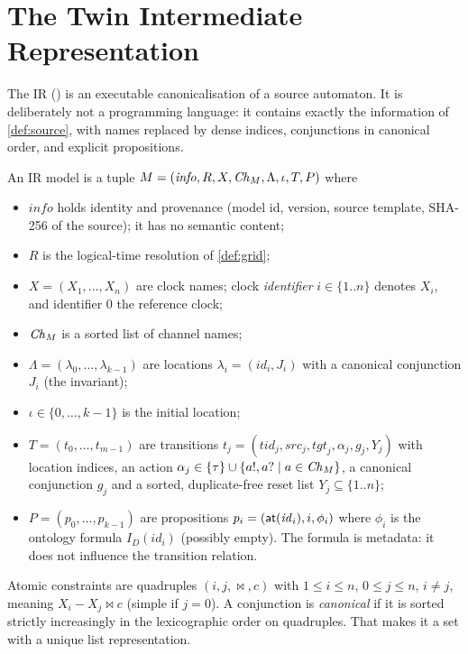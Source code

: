 \section{The Twin Intermediate Representation}\label{sec:ir}

The IR () is an executable canonicalisation of a
source automaton. It is deliberately not a programming language: it contains
exactly the information of \cref{def:source}, with names replaced by dense
indices, conjunctions in canonical order, and explicit propositions.

\begin{definition}[IR model]\label{def:ir}
An IR model is a tuple
$M=(\mathit{info},R,X,\mathit{Ch}_M,\Lambda,\iota,T,P)$ where
\begin{itemize}
\item $\mathit{info}$ holds identity and provenance (model id, version, source
  template, SHA-256 of the source); it has no semantic content;
\item $R$ is the logical-time resolution of \cref{def:grid};
\item $X=(X_1,\dots,X_n)$ are clock names; clock \emph{identifier} $i\in\{1..n\}$
  denotes $X_i$, and identifier $0$ the reference clock;
\item $\mathit{Ch}_M$ is a sorted list of channel names;
\item $\Lambda=(\lambda_0,\dots,\lambda_{k-1})$ are locations
  $\lambda_i=(\mathit{id}_i,J_i)$ with a canonical conjunction $J_i$ (the invariant);
\item $\iota\in\{0,\dots,k-1\}$ is the initial location;
\item $T=(t_0,\dots,t_{m-1})$ are transitions
  $t_j=(\mathit{tid}_j,\mathit{src}_j,\mathit{tgt}_j,\alpha_j,g_j,Y_j)$ with location indices,
  an action $\alpha_j\in\{\tau\}\cup\{a!,a?\mid a\in\mathit{Ch}_M\}$, a canonical conjunction
  $g_j$ and a sorted, duplicate-free reset list $Y_j\subseteq\{1..n\}$;
\item $P=(p_0,\dots,p_{k-1})$ are propositions $p_i=(\mathsf{at}(\mathit{id}_i),i,\phi_i)$ where
  $\phi_i$ is the ontology formula $I_D(\mathit{id}_i)$ (possibly empty). The formula is
  metadata: it does not influence the transition relation.
\end{itemize}
Atomic constraints are quadruples $(i,j,\bowtie,c)$ with $1\le i\le n$, $0\le j\le n$,
$i\ne j$, meaning $X_i-X_j\bowtie c$ (simple if $j=0$). A conjunction is
\emph{canonical} if it is sorted strictly increasingly in the lexicographic order
on quadruples. That makes it a set with a unique list representation.
\end{definition}

